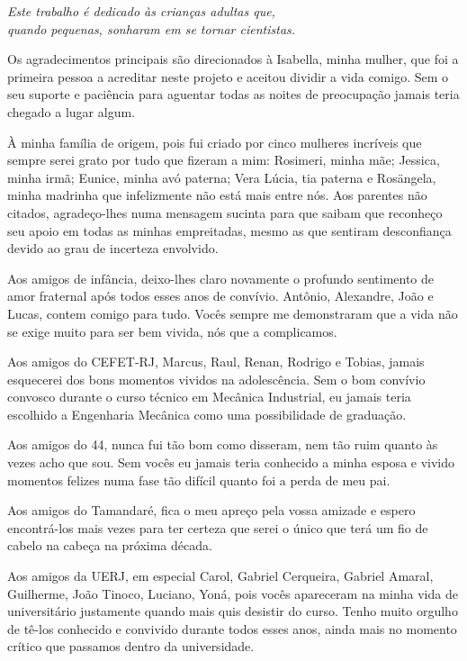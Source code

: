 \begin{dedicatoria}
   \vspace*{\fill}
   \centering
   \noindent
   \textit{ Este trabalho é dedicado às crianças adultas que,\\
   quando pequenas, sonharam em se tornar cientistas.} \vspace*{\fill}
\end{dedicatoria}

\begin{agradecimentos}
Os agradecimentos principais são direcionados à Isabella, minha mulher, que foi a primeira pessoa a acreditar neste projeto e aceitou dividir a vida comigo. Sem o seu suporte e paciência para aguentar todas as noites de preocupação jamais teria chegado a lugar algum.

À minha família de origem, pois fui criado por cinco mulheres incríveis que sempre serei grato por tudo que fizeram a mim: Rosimeri, minha mãe; Jessica, minha irmã; Eunice, minha avó paterna; Vera Lúcia, tia paterna e Rosängela, minha madrinha que infelizmente não está mais entre nós. Aos parentes não citados, agradeço-lhes numa mensagem sucinta para que saibam que reconheço seu apoio em todas as minhas empreitadas, mesmo as que sentiram desconfiança devido ao grau de incerteza envolvido.

Aos amigos de infância, deixo-lhes claro novamente o profundo sentimento de amor fraternal após todos esses anos de convívio. Antônio, Alexandre, João e Lucas, contem comigo para tudo. Vocês sempre me demonstraram que a vida não se exige muito para ser bem vivida, nós que a complicamos.

Aos amigos do CEFET-RJ, Marcus, Raul, Renan, Rodrigo e Tobias, jamais esquecerei dos bons momentos vividos na adolescência. Sem o bom convívio convosco durante o curso técnico em Mecânica Industrial, eu jamais teria escolhido a Engenharia Mecânica como uma possibilidade de graduação.

Aos amigos do 44, nunca fui tão bom como disseram, nem tão ruim quanto às vezes acho que sou. Sem vocês eu jamais teria conhecido a minha esposa e vivido momentos felizes numa fase tão difícil quanto foi a perda de meu pai.

Aos amigos do Tamandaré, fica o meu apreço pela vossa amizade e espero encontrá-los mais vezes para ter certeza que serei o único que terá um fio de cabelo na cabeça na próxima década.

Aos amigos da UERJ, em especial Carol, Gabriel Cerqueira, Gabriel Amaral, Guilherme, João Tinoco, Luciano, Yoná, pois vocês apareceram na minha vida de universitário justamente quando mais quis desistir do curso. Tenho muito orgulho de tê-los conhecido e convivido durante todos esses anos, ainda mais no momento crítico que passamos dentro da universidade.


\end{agradecimentos}
